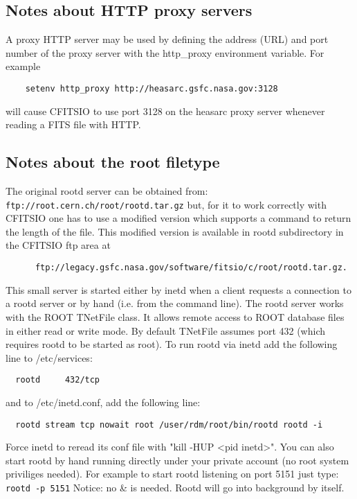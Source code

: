 \documentclass[11pt]{book}
\begin{document}
\subsection{Notes about HTTP proxy servers}

A proxy HTTP server may be used by defining the address (URL) and port
number of the proxy server with the http\_proxy environment variable.
For example

\begin{verbatim}
    setenv http_proxy http://heasarc.gsfc.nasa.gov:3128
\end{verbatim}
will cause CFITSIO to use port 3128 on the heasarc proxy server whenever
reading a FITS file with HTTP.


\subsection{Notes about the root filetype}

The original rootd server can be obtained from:
\verb-ftp://root.cern.ch/root/rootd.tar.gz-
but, for it to work correctly with CFITSIO one has to use a modified
version which supports a command to return the length of the file.
This modified version is available in rootd subdirectory
in the CFITSIO ftp area at

\begin{verbatim}
      ftp://legacy.gsfc.nasa.gov/software/fitsio/c/root/rootd.tar.gz.
\end{verbatim}

This small server is started either by inetd when a client requests a
connection to a rootd server or by hand (i.e. from the command line).
The rootd server works with the ROOT TNetFile class. It allows remote
access to ROOT database files in either read or write mode. By default
TNetFile assumes port 432 (which requires rootd to be started as root).
To run rootd via inetd add the following line to /etc/services:

\begin{verbatim}
  rootd     432/tcp
\end{verbatim}
and to /etc/inetd.conf, add the following line:

\begin{verbatim}
  rootd stream tcp nowait root /user/rdm/root/bin/rootd rootd -i
\end{verbatim}
Force inetd to reread its conf file with "kill -HUP <pid inetd>".
You can also start rootd by hand running directly under your private
account (no root system priviliges needed). For example to start
rootd listening on port 5151 just type:   \verb+rootd -p 5151+
Notice: no \& is needed. Rootd will go into background by itself.
\end{document}
